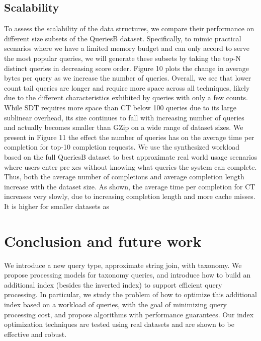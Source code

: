 \documentclass{sig-alternate}
\begin{document}
\subsection{Scalability}

To assess the scalability of the data structures, we compare
their performance on different size subsets of the QueriesB
dataset. Specifically, to mimic practical scenarios where we
have a limited memory budget and can only accord to serve
the most popular queries, we will generate these subsets by
taking the top-N distinct queries in decreasing score order.
Figure 10 plots the change in average bytes per query as we
increase the number of queries. Overall, we see that lower
count tail queries are longer and require more space across all
techniques, likely due to the different characteristics exhibited
by queries with only a few counts. While SDT requires more
space than CT below 100 queries due to its large sublinear
overhead, its size continues to fall with increasing number of
queries and actually becomes smaller than GZip on a wide
range of dataset sizes.
We present in Figure 11 the effect the number of queries
has on the average time per completion for top-10 completion
requests. We use the synthesized workload based on the full
QueriesB dataset to best approximate real world usage scenarios
where users enter prexes without knowing what queries
the system can complete. Thus, both the average number of
completions and average completion length increase with the
dataset size. As shown, the average time per completion for
CT increases very slowly, due to increasing completion length
and more cache misses. It is higher for smaller datasets as



\section{Conclusion and future work}

We introduce a new query type, approximate string join, with taxonomy. We propose processing
models for taxonomy queries, and introduce how to build
an additional index (besides the inverted index) to support
efficient query processing. In particular, we study the problem
of how to optimize this additional index based on a
workload of queries, with the goal of minimizing query processing
cost, and propose algorithms with performance guarantees.
Our index optimization techniques are tested using
real datasets and are shown to be effective and robust.





\end{document}
